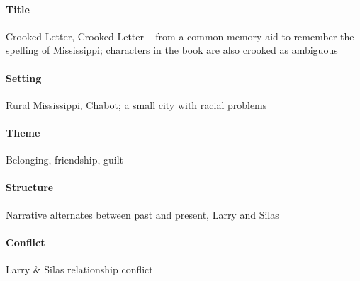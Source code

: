 \documentclass[10pt]{article}
\begin{document}
\paragraph{Title}
Crooked Letter, Crooked Letter -- from a common memory aid to remember the spelling of Mississippi; characters in the book are also crooked as ambiguous

\paragraph{Setting}
Rural Mississippi, Chabot; a small city with racial problems

\paragraph{Theme}
Belonging, friendship, guilt

\paragraph{Structure}
Narrative alternates between past and present, Larry and Silas

\paragraph{Conflict}
Larry \& Silas relationship conflict
\end{document}
